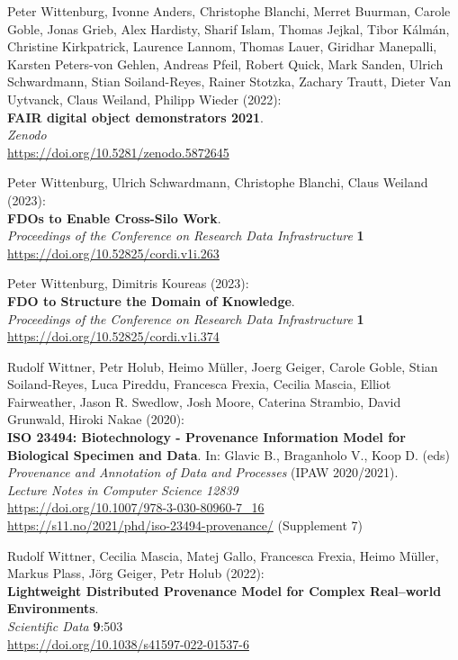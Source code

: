 \begin{thebibliography}{9}
Peter Wittenburg, Ivonne Anders, Christophe Blanchi, Merret Buurman,
Carole Goble, Jonas Grieb, Alex Hardisty, Sharif Islam, Thomas Jejkal,
Tibor Kálmán, Christine Kirkpatrick, Laurence Lannom, Thomas Lauer,
Giridhar Manepalli, Karsten Peters-von Gehlen, Andreas Pfeil, Robert
Quick, Mark Sanden, Ulrich Schwardmann, Stian Soiland-Reyes, Rainer
Stotzka, Zachary Trautt, Dieter Van Uytvanck, Claus Weiland, Philipp
Wieder (2022): \\
\textbf{FAIR digital object demonstrators 2021}.\\
\emph{Zenodo}\\
\url{https://doi.org/10.5281/zenodo.5872645}

Peter Wittenburg, Ulrich Schwardmann, Christophe Blanchi, Claus Weiland (2023):\\
\textbf{FDOs to Enable Cross-Silo Work}.\\
\emph{Proceedings of the Conference on Research Data Infrastructure}
\textbf{1} \\
\url{https://doi.org/10.52825/cordi.v1i.263}

Peter Wittenburg, Dimitris Koureas (2023):\\
\textbf{FDO to Structure the Domain of Knowledge}.\\
\emph{Proceedings of the Conference on Research Data Infrastructure}
\textbf{1} \\
\url{https://doi.org/10.52825/cordi.v1i.374}

Rudolf Wittner, Petr Holub, Heimo Müller, Joerg Geiger, Carole Goble, Stian Soiland-Reyes, Luca Pireddu, Francesca Frexia, Cecilia Mascia, Elliot Fairweather, Jason R. Swedlow, Josh Moore, Caterina Strambio, David Grunwald, Hiroki Nakae (2020):\\
\textbf{ISO 23494: Biotechnology - Provenance Information Model for Biological Specimen and Data}.
In: Glavic B., Braganholo V., Koop D. (eds) 
\emph{Provenance and Annotation of Data and Processes} (IPAW 2020/2021).\\
\emph{Lecture Notes in Computer Science 12839}\\
\url{https://doi.org/10.1007/978-3-030-80960-7_16} \\
\url{https://s11.no/2021/phd/iso-23494-provenance/}
(Supplement 7)

Rudolf Wittner, Cecilia Mascia, Matej Gallo, Francesca Frexia, Heimo Müller, Markus Plass, Jörg Geiger, Petr Holub (2022):\\
\textbf{Lightweight Distributed Provenance Model for Complex Real--world
Environments}.\\
\emph{Scientific Data} \textbf{9}:503 \\
\url{https://doi.org/10.1038/s41597-022-01537-6}


\end{thebibliography}
